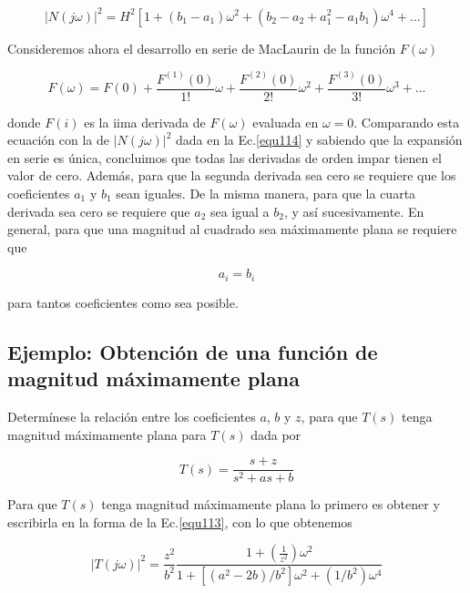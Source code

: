 \documentclass[12pt]{book}
\theoremstyle{definition}
\theoremstyle{remark}
\theoremstyle{plain}
\begin{document}
\begin{equation}
|N(j\omega)|^2= H^2 [1+(b_1-a_1)\omega ^2+ (b_2-a_2+a_1^2-a_1 b_1)\omega ^4+...]
\label{equ114}
\end{equation}

Consideremos ahora el desarrollo en serie de MacLaurin de la función $F(\omega)$

\begin{equation}
F(\omega)= F(0)+\frac{F^{(1)}(0)}{1!}\omega+\frac{F^{(2)}(0)}{2!}\omega ^2+\frac{F^{(3)}(0)}{3!}\omega ^3+...
\label{equ115}
\end{equation}

donde $F(i)$ es la iima derivada de $F(\omega)$ evaluada en $\omega= 0$. Comparando esta ecuación con la de $|N(j\omega)|^2$ dada en la Ec.\ref{equ114} y sabiendo que la expansión en serie es única, concluimos que todas las derivadas de orden impar tienen el valor de cero. Además, para que la segunda derivada sea cero se requiere que los coeficientes $a_1$ y $b_1$ sean iguales. De la misma manera, para que la cuarta derivada sea cero se requiere que $a_2$ sea igual a $b_2$, y así sucesivamente. En general, para que una magnitud al cuadrado sea máximamente plana se requiere que 

\begin{equation}
a_i=b_i
\label{equ116}
\end{equation}

para tantos coeficientes como sea posible.

\subsection{Ejemplo: Obtención de una función de magnitud máximamente plana}

Determínese la relación entre los coeficientes $a$, $b$ y $z$, para que $T(s)$ tenga magnitud máximamente plana para $T(s)$ dada por

\begin{equation*}
T(s)= \frac{s+z}{s^2+ as +b}
\end{equation*}

Para que $T(s)$ tenga magnitud máximamente plana lo primero es obtener y escribirla en la forma de la Ec.\ref{equ113}, con lo que obtenemos

\begin{equation*}
|T(j\omega)|^2 = \frac{z^2}{b^2} \frac{1+(\frac{1}{z^2})\omega ^2}{1+[(a^2-2 b)/b^2]\omega ^2+(1/b^2)\omega ^4}
\end{equation*}
\end{document}

